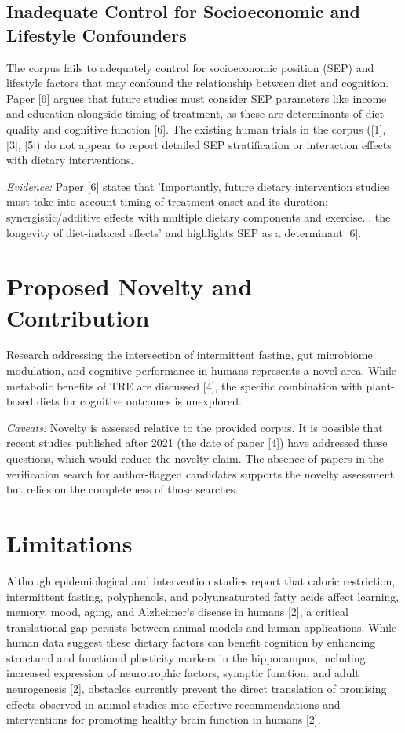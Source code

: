 \documentclass[11pt]{article}
\begin{document}
\subsection{Inadequate Control for Socioeconomic and Lifestyle Confounders}
The corpus fails to adequately control for socioeconomic position (SEP) and lifestyle factors that may confound the relationship between diet and cognition. Paper [6] argues that future studies must consider SEP parameters like income and education alongside timing of treatment, as these are determinants of diet quality and cognitive function [6]. The existing human trials in the corpus ([1], [3], [5]) do not appear to report detailed SEP stratification or interaction effects with dietary interventions.

\textit{Evidence:} Paper [6] states that 'Importantly, future dietary intervention studies must take into account timing of treatment onset and its duration; synergistic/additive effects with multiple dietary components and exercise... the longevity of diet-induced effects' and highlights SEP as a determinant [6].

\section{Proposed Novelty and Contribution}
Research addressing the intersection of intermittent fasting, gut microbiome modulation, and cognitive performance in humans represents a novel area. While metabolic benefits of TRE are discussed [4], the specific combination with plant-based diets for cognitive outcomes is unexplored.

\textit{Caveats:} Novelty is assessed relative to the provided corpus. It is possible that recent studies published after 2021 (the date of paper [4]) have addressed these questions, which would reduce the novelty claim. The absence of papers in the verification search for author-flagged candidates supports the novelty assessment but relies on the completeness of those searches.

\section{Limitations}
Although epidemiological and intervention studies report that caloric restriction, intermittent fasting, polyphenols, and polyunsaturated fatty acids affect learning, memory, mood, aging, and Alzheimer's disease in humans [2], a critical translational gap persists between animal models and human applications. While human data suggest these dietary factors can benefit cognition by enhancing structural and functional plasticity markers in the hippocampus, including increased expression of neurotrophic factors, synaptic function, and adult neurogenesis [2], obstacles currently prevent the direct translation of promising effects observed in animal studies into effective recommendations and interventions for promoting healthy brain function in humans [2].
\end{document}
